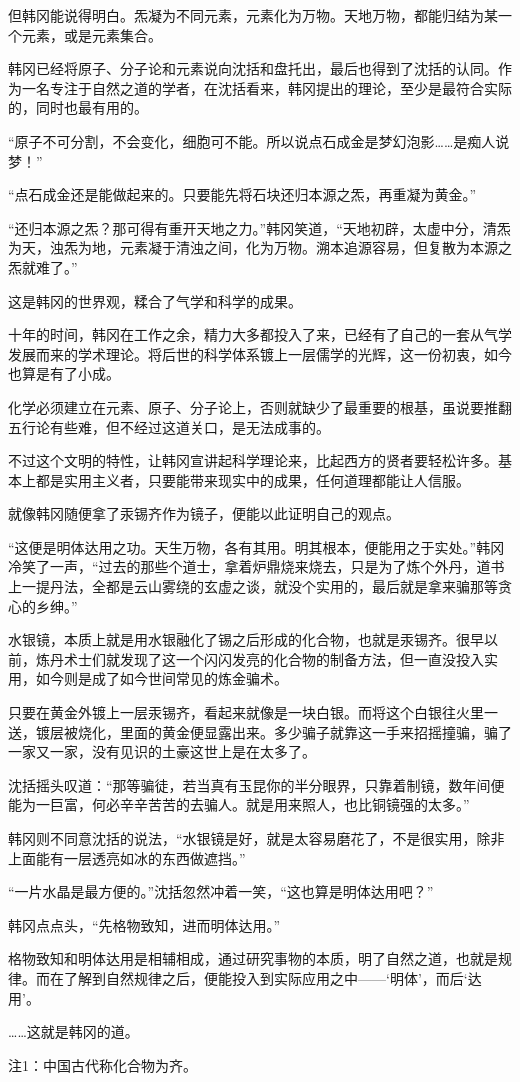 但韩冈能说得明白。炁凝为不同元素，元素化为万物。天地万物，都能归结为某一个元素，或是元素集合。

韩冈已经将原子、分子论和元素说向沈括和盘托出，最后也得到了沈括的认同。作为一名专注于自然之道的学者，在沈括看来，韩冈提出的理论，至少是最符合实际的，同时也最有用的。

“原子不可分割，不会变化，细胞可不能。所以说点石成金是梦幻泡影……是痴人说梦！”

“点石成金还是能做起来的。只要能先将石块还归本源之炁，再重凝为黄金。”

“还归本源之炁？那可得有重开天地之力。”韩冈笑道，“天地初辟，太虚中分，清炁为天，浊炁为地，元素凝于清浊之间，化为万物。溯本追源容易，但复散为本源之炁就难了。”

这是韩冈的世界观，糅合了气学和科学的成果。

十年的时间，韩冈在工作之余，精力大多都投入了来，已经有了自己的一套从气学发展而来的学术理论。将后世的科学体系镀上一层儒学的光辉，这一份初衷，如今也算是有了小成。

化学必须建立在元素、原子、分子论上，否则就缺少了最重要的根基，虽说要推翻五行论有些难，但不经过这道关口，是无法成事的。

不过这个文明的特性，让韩冈宣讲起科学理论来，比起西方的贤者要轻松许多。基本上都是实用主义者，只要能带来现实中的成果，任何道理都能让人信服。

就像韩冈随便拿了汞锡齐作为镜子，便能以此证明自己的观点。

“这便是明体达用之功。天生万物，各有其用。明其根本，便能用之于实处。”韩冈冷笑了一声，“过去的那些个道士，拿着炉鼎烧来烧去，只是为了炼个外丹，道书上一提丹法，全都是云山雾绕的玄虚之谈，就没个实用的，最后就是拿来骗那等贪心的乡绅。”

水银镜，本质上就是用水银融化了锡之后形成的化合物，也就是汞锡齐。很早以前，炼丹术士们就发现了这一个闪闪发亮的化合物的制备方法，但一直没投入实用，如今则是成了如今世间常见的炼金骗术。

只要在黄金外镀上一层汞锡齐，看起来就像是一块白银。而将这个白银往火里一送，镀层被烧化，里面的黄金便显露出来。多少骗子就靠这一手来招摇撞骗，骗了一家又一家，没有见识的土豪这世上是在太多了。

沈括摇头叹道：“那等骗徒，若当真有玉昆你的半分眼界，只靠着制镜，数年间便能为一巨富，何必辛辛苦苦的去骗人。就是用来照人，也比铜镜强的太多。”

韩冈则不同意沈括的说法，“水银镜是好，就是太容易磨花了，不是很实用，除非上面能有一层透亮如冰的东西做遮挡。”

“一片水晶是最方便的。”沈括忽然冲着一笑，“这也算是明体达用吧？”

韩冈点点头，“先格物致知，进而明体达用。”

格物致知和明体达用是相辅相成，通过研究事物的本质，明了自然之道，也就是规律。而在了解到自然规律之后，便能投入到实际应用之中——‘明体’，而后‘达用’。

……这就是韩冈的道。

注1：中国古代称化合物为齐。

